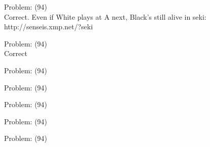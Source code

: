 \documentclass[11pt]{article}
\begin{document}
\begin{minipage}[t]{0.5\textwidth}
  {\centering
  
  Problem: (94)\\
  Correct. Even if White plays at A next, Black's still alive in seki: http://senseis.xmp.net/?seki\\
  }
\end{minipage}
\begin{minipage}[t]{0.5\textwidth}
  {\centering
  
  Problem: (94)\\
  Correct\\
  }
\end{minipage}
\begin{minipage}[t]{0.5\textwidth}
  {\centering
  
  Problem: (94)\\
  
  }
\end{minipage}
\begin{minipage}[t]{0.5\textwidth}
  {\centering
  
  Problem: (94)\\
  
  }
\end{minipage}
\begin{minipage}[t]{0.5\textwidth}
  {\centering
  
  Problem: (94)\\
  
  }
\end{minipage}
\begin{minipage}[t]{0.5\textwidth}
  {\centering
  
  Problem: (94)\\
  
  }
\end{minipage}
\begin{minipage}[t]{0.5\textwidth}
  {\centering
  
  Problem: (94)\\
  
  }
\end{minipage}
\end{document}
